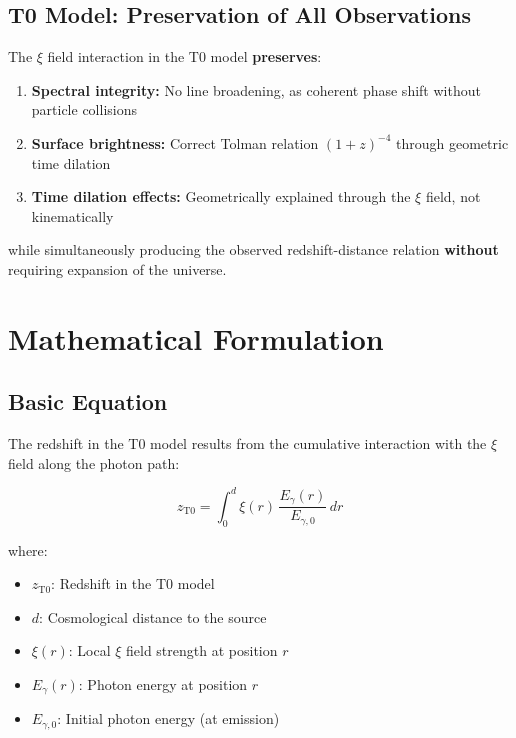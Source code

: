 \subsection{T0 Model: Preservation of All Observations}

The $\xi$ field interaction in the T0 model \textbf{preserves}:

\begin{enumerate}
\item \textbf{Spectral integrity:} 
      No line broadening, as coherent phase shift without particle collisions

\item \textbf{Surface brightness:} 
      Correct Tolman relation $(1+z)^{-4}$ through geometric time dilation

\item \textbf{Time dilation effects:} 
      Geometrically explained through the $\xi$ field, not kinematically
\end{enumerate}

while simultaneously producing the observed redshift-distance relation 
\textbf{without} requiring expansion of the universe.

\section{Mathematical Formulation}

\subsection{Basic Equation}

The redshift in the T0 model results from the cumulative interaction with 
the $\xi$ field along the photon path:

\begin{equation}
z_{\text{T0}} = \int_0^d \xi(r) \, \frac{E_\gamma(r)}{E_{\gamma,0}} \, dr
\label{eq:redshift_t0}
\end{equation}

where:
\begin{itemize}
\item $z_{\text{T0}}$: Redshift in the T0 model
\item $d$: Cosmological distance to the source
\item $\xi(r)$: Local $\xi$ field strength at position $r$
\item $E_\gamma(r)$: Photon energy at position $r$
\item $E_{\gamma,0}$: Initial photon energy (at emission)
\end{itemize}

